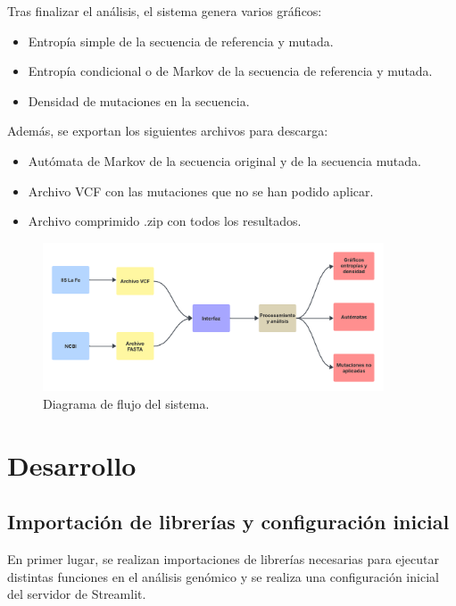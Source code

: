 \documentclass[11pt,spanish,listoffigures,listoftables]{tfgetsinf}
\begin{document}
Tras finalizar el análisis, el sistema genera varios gráficos: 

\begin{itemize}
   \item Entropía simple de la secuencia de referencia y mutada. 
   \item Entropía condicional o de Markov de la secuencia de referencia y mutada. 
   \item Densidad de mutaciones en la secuencia. 
\end{itemize}

Además, se exportan los siguientes archivos para descarga: 
   \begin{itemize}
   \item Autómata de Markov de la secuencia original y de la secuencia mutada. 
   \item Archivo VCF con las mutaciones que no se han podido aplicar. 
   \item Archivo comprimido .zip con todos los resultados. 
\end{itemize}

\begin{figure}[H]
      \centering
      \includegraphics[width=0.9\textwidth]{Diagramas de flujo.png}
      \caption{Diagrama de flujo del sistema.}
      \label{fig:etiqueta_opcional5}
   \end{figure}



\chapter{Desarrollo}

\section{Importación de librerías y configuración inicial }

En primer lugar, se realizan importaciones de librerías necesarias para ejecutar distintas funciones en el análisis genómico y se realiza una configuración inicial del servidor de Streamlit. 
\end{document}
